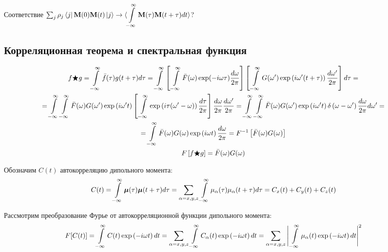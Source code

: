\documentclass[12pt]{article}
\newcommand{\lb}{\left(}
\newcommand{\rb}{\right)}
\newcommand{\mf}{\mathbf}
\newcommand{\vverh}{\vspace*{-0.15cm}}
\newcommand{\intty}{\int\limits_{-\infty}^{\infty}}
\begin{document}
Соответствие $\sum_j \rho_j \bra{j} \mf{M}(0) \mf{M}(t) \ket{j} \rightarrow \displaystyle \langle \int\limits_{-\infty}^{\infty} \mf{M}(\tau) \mf{M}(t + \tau) dt \rangle$?

\subsection*{Корреляционная теорема и спектральная функция}

\begin{gather}
	f \bigstar g = \intty \bar{f}(\tau) g(t + \tau) d \tau = \intty \left[ \, \intty \bar{F}(\omega) \exp(-i \omega \tau) \frac{d \omega}{2 \pi} \right] \left[ \, \intty G(\omega^\prime) \exp \lb i \omega^\prime ( t + \tau) \rb \frac{d \omega^\prime}{2 \pi} \right] d \tau = \notag \\
	= \intty \intty \bar{F}(\omega) G(\omega^\prime) \exp \lb i \omega^\prime t \rb \left[ \, \intty \exp \lb i \tau (\omega^\prime - \omega) \rb \frac{d \tau}{2 \pi} \right] \frac{d \omega}{2 \pi} \frac{d \omega^\prime}{2 \pi} = \intty \intty \bar{F}(\omega)G(\omega^\prime) \exp \lb i \omega^\prime t \rb  \delta \lb \omega - \omega^\prime \rb \frac{d \omega}{2 \pi} d \omega^\prime = \notag \\
	= \intty \bar{F}(\omega) G(\omega) \exp \lb i \omega t \rb \frac{d \omega}{2 \pi} = F^{-1} \left[ \bar{F}(\omega) G(\omega) \right] \notag \\
	F \left[ f \bigstar g \right] = \bar{F}(\omega) G(\omega) \notag
\end{gather}

Обозначим $C(t)$ автокорреляцию дипольного момента:
\vverh
\begin{gather}
	C(t) = \intty \boldsymbol{\mu}(\tau) \boldsymbol{\mu}(t + \tau) d \tau = \sum_{\alpha = x, y, z} \intty \mu_\alpha(\tau) \mu_\alpha(t + \tau) d \tau = C_x (t) + C_y(t) + C_z(t) \notag
\end{gather}

Рассмотрим преобразование Фурье от автокорреляционной функции дипольного момента:
\vverh \vverh \vverh \vverh \vverh
\begin{gather}
	F[C(t)] = \intty C(t) \exp \lb - i \omega t \rb dt = \sum_{\alpha = x, y, z} \intty C_\alpha(t) \exp \lb - i \omega t \rb dt = \sum_{\alpha = x, y, z} \Bigg{|} \intty \mu_\alpha(t) \exp \lb - i \omega t \rb dt \Bigg{|}^2 \notag
\end{gather}
\end{document}
